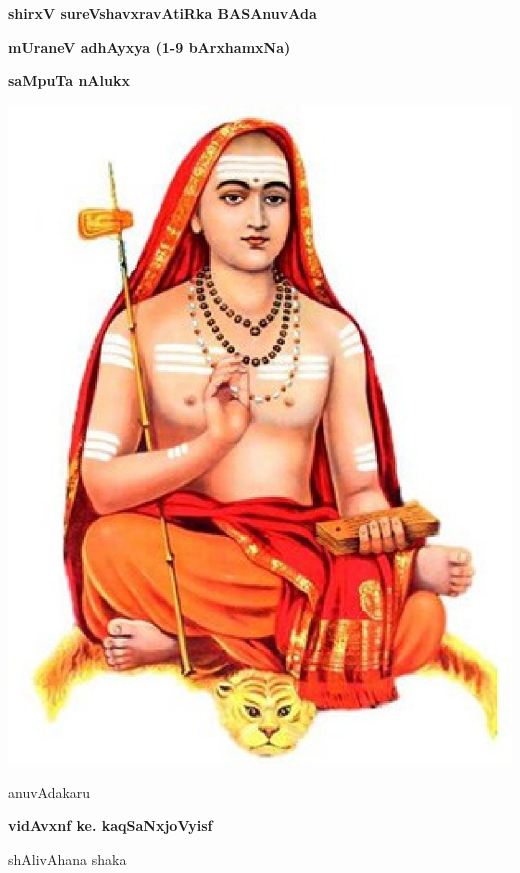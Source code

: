 \thispagestyle{empty}
\begin{center}
{\Huge\bfseries shirxV sureVshavxravAtiRka BASAnuvAda}
\bigskip

{\Large\bfseries mUraneV adhAyxya (1-9 bArxhamxNa)}
\bigskip

{\Large\bfseries saMpuTa nAlukx}
\vfill

\includegraphics[scale=0.7]{figures/figure1.eps}

\vfill

anuvAdakaru
\smallskip

{\large\bfseries vidAvxnf ke. kaqSaNxjoVyisf}

\smallskip
shAlivAhana shaka

\end{center}
